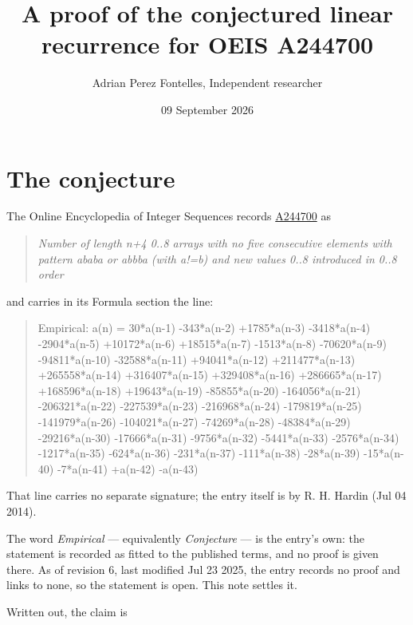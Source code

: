 \documentclass[11pt]{article}
\title{A proof of the conjectured linear recurrence for OEIS A244700}
\author{Adrian Perez Fontelles, Independent researcher}
\date{09 September 2026}
\theoremstyle{definition}
\begin{document}
\maketitle
\section{The conjecture}

The Online Encyclopedia of Integer Sequences records \href{https://oeis.org/A244700}{A244700} as

\begin{quote}\itshape Number of length n+4 0..8 arrays with no five consecutive elements with pattern ababa or abbba (with a!=b) and new values 0..8 introduced in 0..8 order\end{quote}

and carries in its Formula section the line:

\begin{quote}\ttfamily Empirical: a(n) = 30*a(n-1) -343*a(n-2) +1785*a(n-3) -3418*a(n-4) -2904*a(n-5) +10172*a(n-6) +18515*a(n-7) -1513*a(n-8) -70620*a(n-9) -94811*a(n-10) -32588*a(n-11) +94041*a(n-12) +211477*a(n-13) +265558*a(n-14) +316407*a(n-15) +329408*a(n-16) +286665*a(n-17) +168596*a(n-18) +19643*a(n-19) -85855*a(n-20) -164056*a(n-21) -206321*a(n-22) -227539*a(n-23) -216968*a(n-24) -179819*a(n-25) -141979*a(n-26) -104021*a(n-27) -74269*a(n-28) -48384*a(n-29) -29216*a(n-30) -17666*a(n-31) -9756*a(n-32) -5441*a(n-33) -2576*a(n-34) -1217*a(n-35) -624*a(n-36) -231*a(n-37) -111*a(n-38) -28*a(n-39) -15*a(n-40) -7*a(n-41) +a(n-42) -a(n-43)\end{quote}

That line carries no separate signature; the entry itself is by R. H. Hardin (Jul 04 2014).

The word {\itshape Empirical} --- equivalently {\itshape Conjecture} --- is the entry's own: the statement is recorded as fitted to the published terms, and no proof is given there. As of revision 6, last modified Jul 23 2025, the entry records no proof and links to none, so the statement is open. This note settles it.

Written out, the claim is
\end{document}
